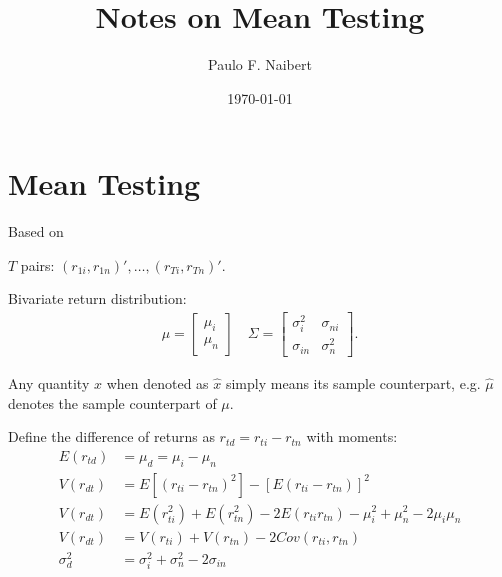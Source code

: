 \documentclass[12pt,oneside,a4paper]{article}
\begin{document}
\title{Notes on Mean Testing}
\author{Paulo F. Naibert}
\date{\today}

\maketitle

\thispagestyle{headings}

\section{Mean Testing}
Based on \cite{lw2008-sr, lw2011-var}

$T$ pairs: $(r_{1i}, r_{1n})', \dots, (r_{Ti}, r_{Tn})'$.


Bivariate return distribution:
\begin{align*}
\mu=
\begin{bmatrix}
\mu_{i} \\ \mu_{n}
\end{bmatrix}
\quad
\Sigma=
\begin{bmatrix}
\sigma_{i}^2 & \sigma_{ni}
\\
\sigma_{in} & \sigma_{n}^2
\end{bmatrix}.
\end{align*}

Any quantity $x$ when denoted as $\hat{x}$ simply means its sample counterpart, e.g. $\hat{\mu}$ denotes the sample counterpart of $\mu$.

Define the difference of returns as $r_{td} = r_{ti} - r_{tn}$ with moments:
\begin{align*}
E(r_{td}) &= \mu_{d} = \mu_{i} - \mu_{n} 
	\\
V(r_{dt})&= E[(r_{ti} - r_{tn})^2] - [E(r_{ti} - r_{tn})]^2
\\
V(r_{dt})&= E(r^2_{ti}) + E(r^2_{tn}) - 2E(r_{ti}r_{tn}) - \mu_{i}^2 + \mu_{n}^2 - 2\mu_{i}\mu_{n}
\\
V(r_{dt}) &= V(r_{ti}) + V(r_{tn}) - 2Cov(r_{ti},r_{tn}) 
\\
\sigma^2_{d} &= \sigma^2_{i} + \sigma^2_{n} - 2\sigma_{in}
\end{align*}
\end{document}
